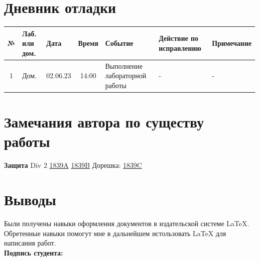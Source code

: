 \documentclass[12pt, letterpaper]{article}
\begin{document}
\section{Дневник отладки}
\begin{tabular}{|c|p{1cm}|p{1.5cm}|c|p{2.5cm}|p{2cm}|p{2.25cm}|}
    \hline
    № & Лаб. или дом. & Дата & Время & Событие & Действие по исправлению & Примечание\\
    \hline
    1 & Дом. & 02.06.23 & 14:00 & Выполнение лабораторной работы & - & -\\
    \hline
\end{tabular}
\section{Замечания автора по существу работы}
\textbf{Защита}\newline
Div 2\newline
\href{https://codeforces.com/contest/1839/submission/208324417}{1839A}\newline
\href{https://codeforces.com/contest/1839/submission/208330516}{1839B}\newline
Дорешка:\newline
\href{https://codeforces.com/contest/1839/submission/209869762}{1839C}
\section{Выводы}
Были получены навыки оформления документов в издательской системе \LaTeX{}. Обретенные навыки помогут мне в дальнейшем истользовать \LaTeX{} для написания работ. \\
\flushright \textbf{Подпись студента:} \underline{\hspace{3cm}}
\end{document}
